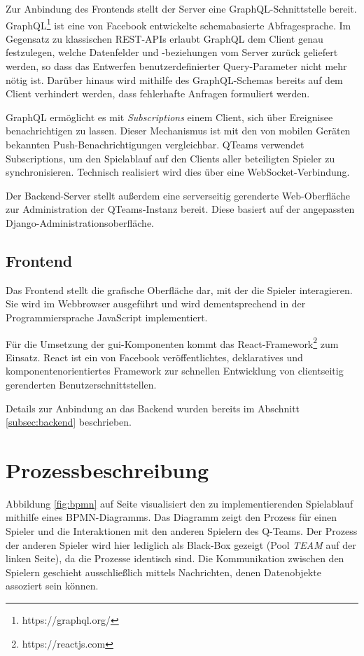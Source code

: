 \documentclass[a4paper,11pt,listof=numbered,glossary=totoc,parskip=half,toc=bib]{scrreprt}
\begin{document}
	Zur Anbindung des Frontends stellt der Server eine GraphQL-Schnittstelle bereit. GraphQL\footnote{https://graphql.org/} ist eine von Facebook entwickelte schemabasierte Abfragesprache. Im Gegensatz zu klassischen REST-APIs erlaubt GraphQL dem Client genau festzulegen, welche Datenfelder und -beziehungen vom Server zurück geliefert werden, so dass das Entwerfen benutzerdefinierter Query-Parameter nicht mehr nötig ist. Darüber hinaus wird mithilfe des GraphQL-Schemas bereits auf dem Client verhindert werden, dass fehlerhafte Anfragen formuliert werden.
	
	GraphQL ermöglicht es mit \textit{Subscriptions} einem Client, sich über Ereignisee benachrichtigen zu lassen. Dieser Mechanismus ist mit den von mobilen Geräten bekannten Push-Benachrichtigungen vergleichbar. QTeams verwendet Subscriptions, um den Spielablauf auf den Clients aller beteiligten Spieler zu synchronisieren. Technisch realisiert wird dies über eine WebSocket-Verbindung.

	Der Backend-Server stellt außerdem eine serverseitig gerenderte Web-Oberfläche zur Administration der QTeams-Instanz bereit. Diese basiert auf der angepassten Django-Administrationsoberfläche.
	
	\subsection{Frontend}
	Das Frontend stellt die grafische Oberfläche dar, mit der die Spieler interagieren. Sie wird im Webbrowser ausgeführt und wird dementsprechend in der Programmiersprache JavaScript implementiert.
	
	 Für die Umsetzung der \Gls{gui}-Komponenten kommt das React-Framework\footnote{https://reactjs.com} zum Einsatz. React ist ein von Facebook veröffentlichtes, deklaratives und komponentenorientiertes Framework zur schnellen Entwicklung von clientseitig gerenderten Benutzerschnittstellen.
	
	Details zur Anbindung an das Backend wurden bereits im Abschnitt \ref{subsec:backend} beschrieben.

	\section{Prozessbeschreibung}
	
	Abbildung \ref{fig:bpmn} auf Seite \pageref{fig:bpmn} visualisiert den zu implementierenden Spielablauf mithilfe eines BPMN-Diagramms. Das Diagramm zeigt den Prozess für einen Spieler und die Interaktionen mit den anderen Spielern des Q-Teams. Der Prozess der anderen Spieler wird hier lediglich als Black-Box gezeigt (Pool \textit{TEAM} auf der linken Seite), da die Prozesse identisch sind. Die Kommunikation zwischen den Spielern geschieht ausschließlich mittels Nachrichten, denen Datenobjekte assoziert sein können.
	
\end{document}
